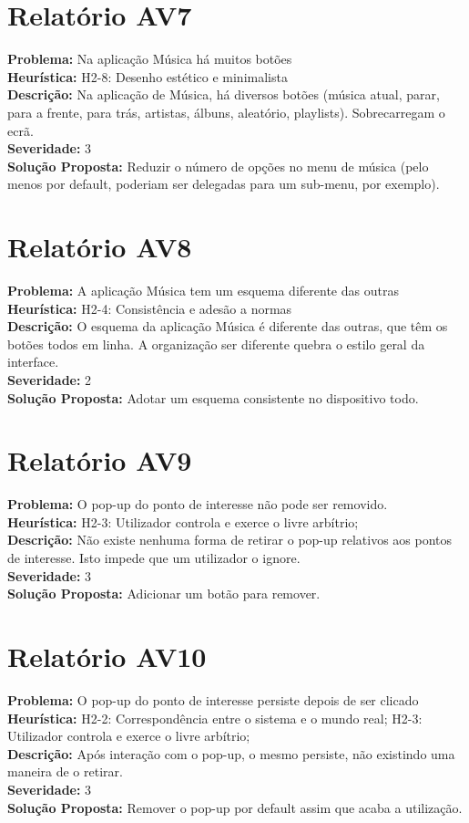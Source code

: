 \documentclass[a4paper]{article}
\begin{document}
\begin{multicols}{2}
\section*{Relatório AV7}
\textbf{Problema:} Na aplicação Música há muitos botões\\
\textbf{Heurística:} H2-8: Desenho estético e minimalista\\
\textbf{Descrição:} Na aplicação de Música, há diversos botões (música atual, parar, para a frente, para trás, artistas, álbuns, aleatório, playlists). Sobrecarregam o ecrã.\\
\textbf{Severidade:} 3\\
  \textbf{Solução Proposta:} Reduzir o número de opções no menu de música (pelo
  menos por default, poderiam ser delegadas para um sub-menu, por exemplo).

\section*{Relatório AV8}
\textbf{Problema:} A aplicação Música tem um esquema diferente das outras\\
\textbf{Heurística:} H2-4: Consistência e adesão a normas\\
\textbf{Descrição:} O esquema da aplicação Música é diferente das outras, que têm os botões todos em linha. A organização ser diferente quebra o estilo geral da interface.\\
\textbf{Severidade:} 2\\
\textbf{Solução Proposta:} Adotar um esquema consistente no dispositivo todo.

\section*{Relatório AV9}
\textbf{Problema:} O pop-up do ponto de interesse não pode ser removido.\\
\textbf{Heurística:} H2-3: Utilizador controla e exerce o livre arbítrio;\\
\textbf{Descrição:} Não existe nenhuma forma de retirar o pop-up relativos aos pontos de interesse. Isto impede que um utilizador o ignore.\\
\textbf{Severidade:} 3\\
\textbf{Solução Proposta:} Adicionar um botão para remover.

\section*{Relatório AV10}
\textbf{Problema:} O pop-up do ponto de interesse persiste depois de ser clicado\\
\textbf{Heurística:} H2-2: Correspondência entre o sistema e o mundo real; H2-3: Utilizador controla e exerce o livre arbítrio;\\
\textbf{Descrição:} Após interação com o pop-up, o mesmo persiste, não existindo uma maneira de o retirar.\\
\textbf{Severidade:} 3\\
\textbf{Solução Proposta:} Remover o pop-up por default assim que acaba a
utilização.
\end{multicols}
\end{document}
